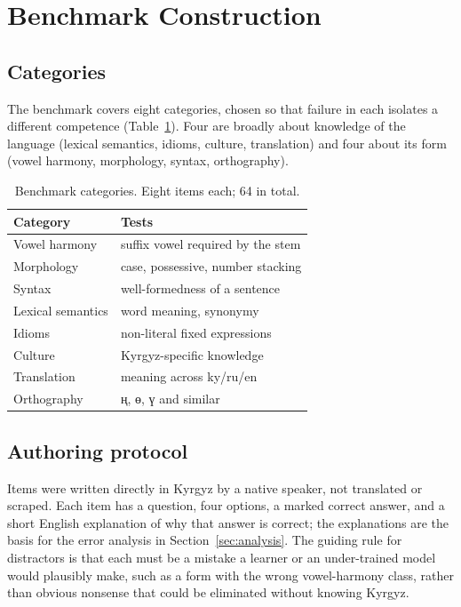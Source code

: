 \documentclass{article}
\newcommand{\ky}[1]{\foreignlanguage{russian}{#1}}
\begin{document}
\section{Benchmark Construction}
\label{sec:benchmark}

\subsection{Categories}

The benchmark covers eight categories, chosen so that failure in each isolates a
different competence (Table~\ref{tab:categories}). Four are broadly about knowledge
of the language (lexical semantics, idioms, culture, translation) and four about its
form (vowel harmony, morphology, syntax, orthography).

\begin{table}[h]
\centering
\small
\begin{tabular}{ll}
\toprule
Category & Tests \\
\midrule
Vowel harmony      & suffix vowel required by the stem \\
Morphology         & case, possessive, number stacking \\
Syntax             & well-formedness of a sentence \\
Lexical semantics  & word meaning, synonymy \\
Idioms             & non-literal fixed expressions \\
Culture            & Kyrgyz-specific knowledge \\
Translation        & meaning across ky/ru/en \\
Orthography        & \ky{ң}, \ky{ө}, \ky{ү} and similar \\
\bottomrule
\end{tabular}
\caption{Benchmark categories. Eight items each; 64 in total.}
\label{tab:categories}
\end{table}

\subsection{Authoring protocol}

Items were written directly in Kyrgyz by a native speaker, not translated or scraped.
Each item has a question, four options, a marked correct answer, and a short English
explanation of why that answer is correct; the explanations are the basis for the
error analysis in Section~\ref{sec:analysis}. The guiding rule for distractors is that
each must be a mistake a learner or an under-trained model would plausibly make, such
as a form with the wrong vowel-harmony class, rather than obvious nonsense that could
be eliminated without knowing Kyrgyz.
\end{document}
